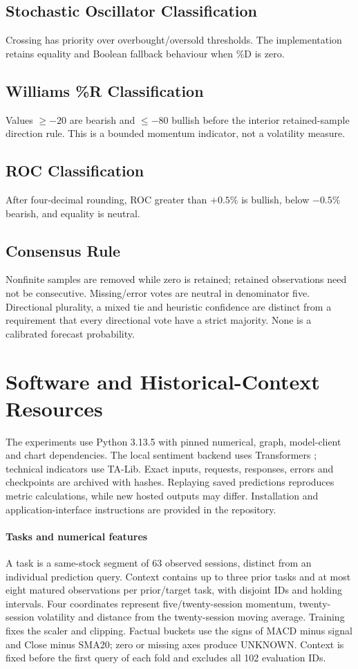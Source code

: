 \subsection{Stochastic Oscillator Classification}
Crossing has priority over overbought/oversold thresholds. The implementation retains equality and Boolean fallback behaviour when \%D is zero.
\subsection{Williams \%R Classification}
Values $\ge-20$ are bearish and $\le-80$ bullish before the interior retained-sample direction rule. This is a bounded momentum indicator, not a volatility measure.
\subsection{ROC Classification}
After four-decimal rounding, ROC greater than $+0.5\%$ is bullish, below $-0.5\%$ bearish, and equality is neutral.
\subsection{Consensus Rule}
Nonfinite samples are removed while zero is retained; retained observations need not be consecutive. Missing/error votes are neutral in denominator five. Directional plurality, a mixed tie and heuristic confidence are distinct from a requirement that every directional vote have a strict majority. None is a calibrated forecast probability.

\FloatBarrier
\section{Software and Historical-Context Resources}
\label{app:software}
The experiments use Python 3.13.5 with pinned numerical, graph, model-client and chart dependencies. The local sentiment backend uses Transformers \cite{wolf2020transformers}; technical indicators use TA-Lib. Exact inputs, requests, responses, errors and checkpoints are archived with hashes. Replaying saved predictions reproduces metric calculations, while new hosted outputs may differ. Installation and application-interface instructions are provided in the repository.

\paragraph{Tasks and numerical features}
A task is a same-stock segment of 63 observed sessions, distinct from an individual prediction query. Context contains up to three prior tasks and at most eight matured observations per prior/target task, with disjoint IDs and holding intervals. Four coordinates represent five/twenty-session momentum, twenty-session volatility and distance from the twenty-session moving average. Training fixes the scaler and clipping. Factual buckets use the signs of MACD minus signal and Close minus SMA20; zero or missing axes produce UNKNOWN. Context is fixed before the first query of each fold and excludes all 102 evaluation IDs.

